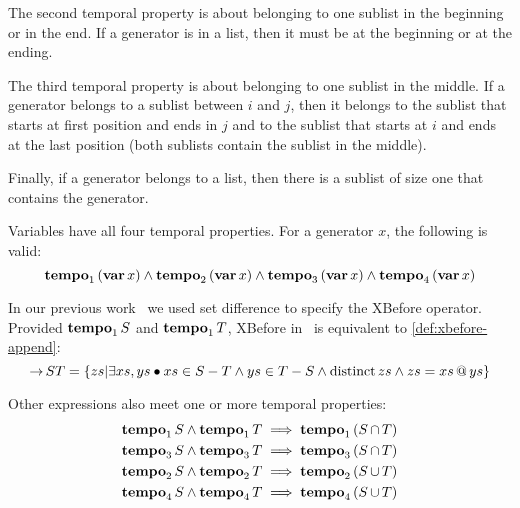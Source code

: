 \documentclass[en,twoside,onehalfspacing,phd]{risethesis}
\makeatletter
\def\varop{\ensuremath\operatorname{\mathbf{var}}}
\newcommand{\var}[1]{\ensuremath\varop #1}
\def\xbeforeop{\ensuremath\rightarrow}
\newcommand{\xbefore}[2]{\ensuremath #1 \xbeforeop #2 }
\def\Tempotext{Tempo\xspace}
\def\tempoop{\ensuremath\operatorname{\mathbf{tempo}}}
\newcommand{\tempo}[2][1-4]{\ensuremath\tempoop_{#1} #2}
\def\distinctop{\ensuremath\operatorname{distinct}}
\newcommand{\distinct}[1]{\ensuremath\distinctop #1}
\newcommand{\append}[2]{\ensuremath #1 \operatorname{\mathbf{@}} #2}
\newcommand{\parsin}[1]{\ensuremath\left( #1 \right)}
\def\union{\ensuremath\operatorname{\cup}}
\def\inter{\ensuremath\operatorname{\cap}}
\def\xbefore{\ensuremath\operatorname{\rightarrow}}
\makeatother
\begin{document}
The second temporal property is about belonging to one sublist in the beginning or in the end.
If a generator is in a list, then it must be at the beginning or at the ending.
%
%

The third temporal property is about belonging to one sublist in the middle.
If a generator belongs to a sublist between $i$ and $j$, then it belongs to the sublist that starts at first position and ends in $j$ and to the sublist that starts at $i$ and ends at the last position (both sublists contain the sublist in the middle).
%
%

Finally, if a generator belongs to a list, then there is a sublist of size one that contains the generator.
%
%

Variables have all four temporal properties. For a generator $x$, the following is valid:
%
\[
\tempo[1]{\left(\var{x}\right)} \land
\tempo[2]{\left(\var{x}\right)} \land
\tempo[3]{\left(\var{x}\right)} \land
\tempo[4]{\left(\var{x}\right)}
\]

\begin{sloppypar}
In our previous work~\cite{DM2015} we used set difference to specify the XBefore operator.
Provided $\tempo[1]{S}$ and $\tempo[1]{T}$, XBefore in~\cite{DM2015} is equivalent to \eqref{def:xbefore-append}:
%
\begin{equation}
\xbefore{S}{T} = \left\{ zs | \exists xs, ys \bullet xs \in S-T \land ys \in T-S \land \distinct{zs} \land zs = \append{xs}{ys}  \right\}
\end{equation}
\end{sloppypar}

Other expressions also meet one or more temporal properties:
\begin{subequations}
\begin{align}
\tempo[1]{S} \land \tempo[1]{T} & \implies \tempo[1]{\parsin{S \inter T}}\\
\tempo[3]{S} \land \tempo[3]{T} & \implies \tempo[3]{\parsin{S \inter T}}\\
\tempo[2]{S} \land \tempo[2]{T} & \implies \tempo[2]{\parsin{S \union T}}\\
\tempo[4]{S} \land \tempo[4]{T} & \implies \tempo[4]{\parsin{S \union T}}
\end{align}
\end{subequations}
\end{document}
